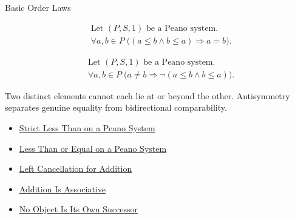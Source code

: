 \begin{topicbox}{Basic Order Laws}
\begin{remark*}
\[
\begin{aligned}
&\text{Let } (P,S,1) \text{ be a Peano system.}\\
&\forall a,b \in P\;
\bigl((a \le b \land b \le a) \Longrightarrow a=b\bigr).
\end{aligned}
\]
\end{remark*}

\begin{remark*}
\[
\begin{aligned}
&\text{Let } (P,S,1) \text{ be a Peano system.}\\
&\forall a,b \in P\;
\bigl(a \neq b \Longrightarrow \neg(a \le b \land b \le a)\bigr).
\end{aligned}
\]
\end{remark*}

\begin{remark*}[Interpretation]
Two distinct elements cannot each lie at or beyond the other. Antisymmetry
separates genuine equality from bidirectional comparability.
\end{remark*}

\begin{dependencies}
\begin{itemize}
  \item \hyperref[def:strict-less-than-on-peano-system]{Strict Less Than on a Peano System}
  \item \hyperref[def:less-than-or-equal-on-peano-system]{Less Than or Equal on a Peano System}
  \item \hyperref[thm:addition-left-cancellation]{Left Cancellation for Addition}
  \item \hyperref[thm:addition-associative]{Addition Is Associative}
  \item \hyperref[thm:no-object-is-its-own-successor]{No Object Is Its Own Successor}
\end{itemize}
\end{dependencies}
\end{topicbox}

